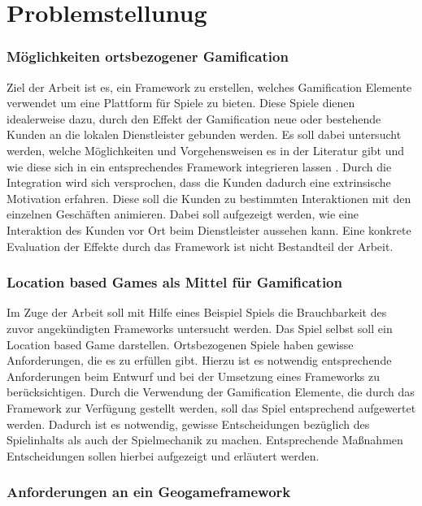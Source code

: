 \chapter{Problemstellunug}
\label{ch2:Problemstellunug}

\subsection*{Möglichkeiten ortsbezogener Gamification}

Ziel der Arbeit ist es, ein Framework zu erstellen, welches Gamification Elemente verwendet um eine Plattform für Spiele zu bieten. Diese Spiele dienen idealerweise dazu, durch den Effekt der Gamification neue oder bestehende Kunden an die lokalen Dienstleister gebunden werden. Es soll dabei untersucht werden, welche Möglichkeiten und Vorgehensweisen es in der Literatur gibt und wie diese sich in ein entsprechendes Framework integrieren lassen .
Durch die Integration wird sich versprochen, dass die Kunden dadurch eine extrinsische Motivation erfahren. Diese soll die Kunden zu bestimmten Interaktionen mit den einzelnen Geschäften animieren.
Dabei soll aufgezeigt werden, wie eine Interaktion des Kunden vor Ort beim Dienstleister aussehen kann. Eine konkrete Evaluation der Effekte durch das Framework ist nicht Bestandteil der Arbeit.

\subsection*{Location based Games als Mittel für Gamification}

Im Zuge der Arbeit soll mit Hilfe eines Beispiel Spiels die Brauchbarkeit des zuvor angekündigten Frameworks untersucht werden.
Das Spiel selbst soll ein Location based Game darstellen. Ortsbezogenen Spiele haben gewisse Anforderungen, die es zu erfüllen gibt. Hierzu 
ist es notwendig entsprechende Anforderungen beim Entwurf und bei der Umsetzung eines Frameworks zu berücksichtigen.
Durch die Verwendung der Gamification Elemente, die durch das Framework zur Verfügung gestellt werden, soll das Spiel entsprechend aufgewertet werden. Dadurch ist es notwendig, gewisse Entscheidungen bezüglich des Spielinhalts als auch der Spielmechanik zu machen.
Entsprechende Maßnahmen Entscheidungen sollen hierbei aufgezeigt und erläutert werden.

\subsection*{Anforderungen an ein Geogameframework}

